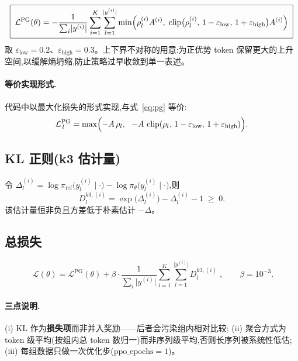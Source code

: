 \documentclass[UTF8, 11pt]{ctexart}
\DeclareMathOperator{\clip}{clip}
\begin{document}
\begin{equation}
\boxed{\;
\mathcal{L}^{\text{PG}}(\theta)
=-\frac{1}{\sum_{i}\lvert y^{(i)}\rvert}
\sum_{i=1}^{K}\sum_{l=1}^{\lvert y^{(i)}\rvert}
\min\Bigl(
\rho^{(i)}_{l}A^{(i)},\;
\clip\bigl(\rho^{(i)}_{l},\,1-\varepsilon_{\text{low}},\,1+\varepsilon_{\text{high}}\bigr)A^{(i)}
\Bigr)\;}
\label{eq:pg}
\end{equation}
取 $\varepsilon_{\text{low}}=0.2$、$\varepsilon_{\text{high}}=0.3$。上下界不对称的用意:为正优势 token 保留更大的上升空间,以缓解熵坍缩,防止策略过早收敛到单一表述。

\paragraph{等价实现形式.} 代码中以最大化损失的形式实现,与式~\eqref{eq:pg} 等价:
\begin{equation}
\mathcal{L}^{\text{PG}}_{\,l}
=\max\Bigl(-A\,\rho_l,\ \ -A\,\clip(\rho_l,\,1-\varepsilon_{\text{low}},\,1+\varepsilon_{\text{high}})\Bigr).
\label{eq:pgcode}
\end{equation}

\subsection{KL 正则(k3 估计量)}

令 $\Delta^{(i)}_{l}=\log\pi_{\text{ref}}\bigl(y^{(i)}_{l}\mid\cdot\bigr)-\log\pi_{\theta}\bigl(y^{(i)}_{l}\mid\cdot\bigr)$,则
\begin{equation}
D^{k3,(i)}_{l}
=\exp\bigl(\Delta^{(i)}_{l}\bigr)-\Delta^{(i)}_{l}-1\;\ge\;0 .
\label{eq:k3}
\end{equation}
该估计量恒非负且方差低于朴素估计 $-\Delta$。

\subsection{总损失}

\begin{equation}
\boxed{\;
\mathcal{L}(\theta)
=\mathcal{L}^{\text{PG}}(\theta)
+\beta\cdot\frac{1}{\sum_{i}\lvert y^{(i)}\rvert}
\sum_{i=1}^{K}\sum_{l=1}^{\lvert y^{(i)}\rvert} D^{k3,(i)}_{l}\;},
\qquad \beta=10^{-3}.
\label{eq:loss}
\end{equation}

\paragraph{三点说明.}
(i) KL 作为\textbf{损失项}而非并入奖励——后者会污染组内相对比较;
(ii) 聚合方式为 token 级平均(按组内总 token 数归一)而非序列级平均,否则长序列被系统性低估;
(iii) 每组数据只做一次优化步($\text{ppo\_epochs}=1$)。
\end{document}
